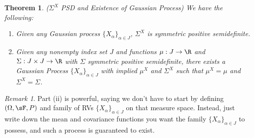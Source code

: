 \documentclass[12pt]{article}
\theoremstyle{plain}
\newtheorem{thm}{Theorem}[section]
\theoremstyle{definition}
\theoremstyle{remark}
\newtheorem*{rmk}{Remark}
\newcommand{\ra}{\rightarrow}
\begin{document}
\begin{thm}\emph{($\Sigma^X$ PSD and Existence of Gaussian Process)}
\label{thm:gaussian}
We have the following:
\begin{enumerate}[label=\emph{(\roman*)}]
  \item
    Given any Gaussian process $\{X_\alpha\}_{\alpha\in J}$,
    $\Sigma^X$ is symmetric positive semidefinite.
  \item
    Given any nonempty index set $J$ and functions $\mu:J\ra\R$ and
    $\Sigma:J\times J\ra\R$ with $\Sigma$ symmetric positive
    semidefinite, there exists a Gaussian Process
    $\{X_\alpha\}_{\alpha\in J}$ with implied $\mu^X$ and $\Sigma^X$
    such that $\mu^X=\mu$ and $\Sigma^X=\Sigma$.
\end{enumerate}
\end{thm}
\begin{rmk}
Part (ii) is powerful, saying we don't have to start by defining
$(\Omega,\sF,P)$ and family of RVs $\{X_\alpha\}_{\alpha\in J}$ on that
measure space. Instead, just write down the mean and covariance
functions you want the family $\{X_\alpha\}_{\alpha\in J}$ to possess,
and such a process is guaranteed to exist.
\end{rmk}
\end{document}
